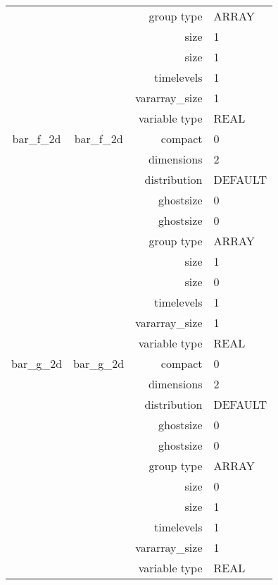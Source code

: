 \begin{tabular*}{150mm}{|c|c@{\extracolsep{\fill}}|rl|}
 &  & group type & ARRAY \\ 
 &  & size & 1 \\ 
& ~ & size & 1 \\ 
 &  & timelevels & 1 \\ 
 &  & vararray\_size & 1 \\ 
 &  & variable type & REAL \\ 
\hline 
bar\_f\_2d & bar\_f\_2d & compact & 0 \\ 
 &  & dimensions & 2 \\ 
 &  & distribution & DEFAULT \\ 
 &  & ghostsize & 0 \\ 
& ~ & ghostsize & 0 \\ 
 &  & group type & ARRAY \\ 
 &  & size & 1 \\ 
& ~ & size & 0 \\ 
 &  & timelevels & 1 \\ 
 &  & vararray\_size & 1 \\ 
 &  & variable type & REAL \\ 
\hline 
bar\_g\_2d & bar\_g\_2d & compact & 0 \\ 
 &  & dimensions & 2 \\ 
 &  & distribution & DEFAULT \\ 
 &  & ghostsize & 0 \\ 
& ~ & ghostsize & 0 \\ 
 &  & group type & ARRAY \\ 
 &  & size & 0 \\ 
& ~ & size & 1 \\ 
 &  & timelevels & 1 \\ 
 &  & vararray\_size & 1 \\ 
 &  & variable type & REAL \\ 
\hline 
\end{tabular*} 



\vspace{5mm}
\vspace{5mm}

